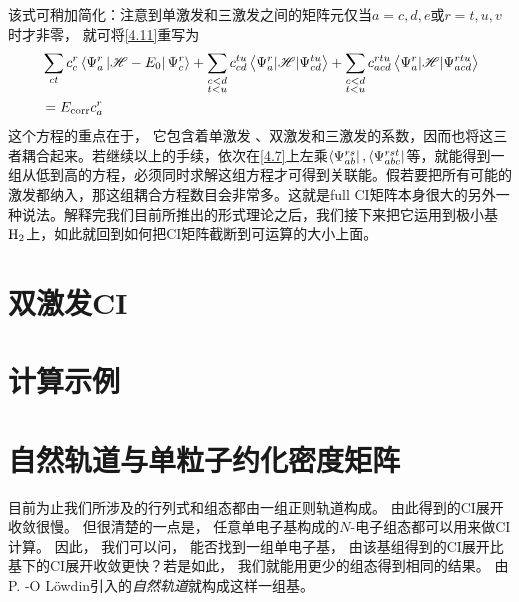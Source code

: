 该式可稍加简化：注意到单激发和三激发之间的矩阵元仅当$a=c,d,e$或$r=t,u,v$时才非零，
就可将\eqref{4.11}重写为
\begin{align}
&\sum_{c t} c_{c}^{r}\left\langle\Psi_{a}^{r}\left|\mathscr{H}-E_{0}\right| \Psi_{c}^{r}\right\rangle+\sum_{\substack{c<d \\ t<u}} c_{cd}^{tu}\left\langle\Psi_{a}^{r}|\mathscr{H}| \Psi_{c d}^{tu}\right\rangle+\sum_{\substack{c<d\\ t<u}} c_{acd}^{rtu}\left\langle\Psi_{a}^{r}|\mathscr{H}| \Psi_{acd}^{rtu}\right\rangle \notag \\
&=E_{\mathrm{corr}} c_{a}^{r}
\label{4.12}
\end{align}
这个方程的重点在于，
它包含着单激发
、双激发和三激发的系数，因而也将这三者耦合起来。若继续以上的手续，依次在\eqref{4.7}上左乘$\Bra{\Psi_{ab}^{rs}},\Bra{\Psi_{abc}^{rst}}$等，就能得到一组从低到高的方程，必须同时求解这组方程才可得到关联能。假若要把所有可能的激发都纳入，那这组耦合方程数目会非常多。这就是full CI矩阵本身很大的另外一种说法。解释完我们目前所推出的形式理论之后，我们接下来把它运用到极小基$\mathrm{H}_2$上，如此就回到如何把CI矩阵截断到可运算的大小上面。





















\section{双激发CI}\mbox{}
\label{sec4.2}
\section{计算示例}\mbox{}
\label{sec4.3}
\section{自然轨道与单粒子约化密度矩阵}
\label{sec4.4}
目前为止我们所涉及的行列式和组态都由一组正则\hft 轨道构成。
由此得到的CI展开收敛很慢。
但很清楚的一点是，
任意单电子基构成的$N$-电子组态都可以用来做CI计算。
因此，
我们可以问，
能否找到一组单电子基，
由该基组得到的CI展开比\hft 基下的CI展开收敛更快？若是如此，
我们就能用更少的组态得到相同的结果。
由P.
-O L\"owdin引入的\emph{自然轨道}就构成这样一组基。


